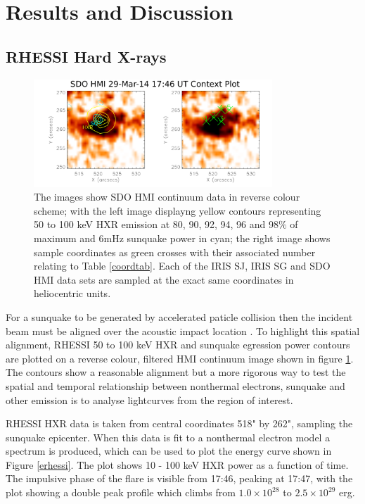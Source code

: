 \section{Results and Discussion}

\subsection{RHESSI Hard X-rays}\label{rhessiresults}
\begin{figure}[H]
  \begin{center}
  \includegraphics[width=0.8\textwidth]{29-Mar-14-HMI-Sunquake-Context-Plot}
  \end{center}
  \caption{The images show SDO HMI continuum data in reverse colour scheme; with the left image displayng yellow contours representing 50 to 100 keV HXR emission at 80, 90, 92, 94, 96 and 98$\%$ of maximum and 6mHz sunquake power in cyan; the right image shows sample coordinates as green crosses with their associated number relating to Table \ref{coordtab}. Each of the IRIS SJ, IRIS SG and SDO HMI data sets are sampled at the exact same coordinates in heliocentric units.}\label{hmicontext}
\end{figure}


For a sunquake to be generated by accelerated paticle collision then the incident beam must be aligned over the acoustic impact location \citep{1998IAUS..185..191K}. To highlight this spatial alignment, RHESSI 50 to 100 keV HXR and sunquake egression power contours are plotted on a reverse colour, filtered HMI continuum image shown in figure \ref{hmicontext}. The contours show a reasonable alignment but a more rigorous way to test the spatial and temporal relationship between nonthermal electrons, sunquake and other emission is to analyse lightcurves from the region of interest.   %

RHESSI HXR data is taken from central coordinates 518" by 262", sampling the sunquake epicenter. When this data is fit to a nonthermal electron model a spectrum is produced, which can be used to plot the energy curve shown in Figure \ref{erhessi}. The plot shows 10 - 100 keV HXR power as a function of time. The impulsive phase of the flare is visible from 17:46, peaking at 17:47, with the plot showing a double peak profile which climbs from $1.0{\times}10^{28}$ to $2.5{\times}10^{29}$ erg. 



